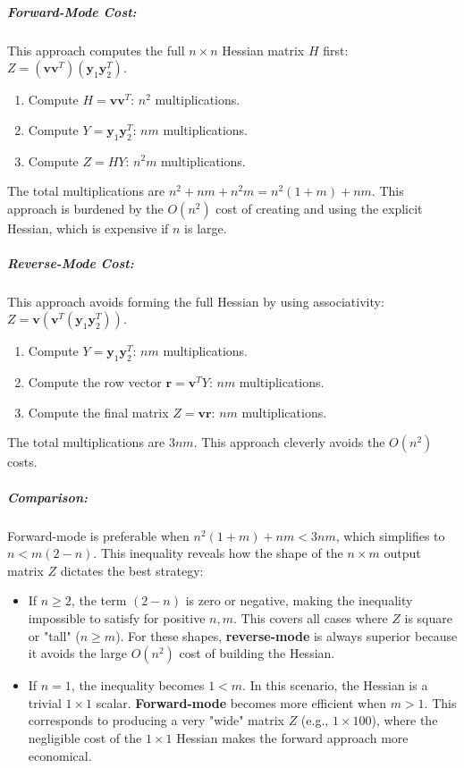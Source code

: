 \documentclass{article}
\begin{document}
\subparagraph{Forward-Mode Cost:}
This approach computes the full $n \times n$ Hessian matrix $H$ first: $Z = (\mathbf{v}\mathbf{v}^T) (\mathbf{y}_1\mathbf{y}_2^T)$.
\begin{enumerate}
    \item Compute $H = \mathbf{v}\mathbf{v}^T$: $n^2$ multiplications.
    \item Compute $Y = \mathbf{y}_1\mathbf{y}_2^T$: $nm$ multiplications.
    \item Compute $Z = HY$: $n^2m$ multiplications.
\end{enumerate}
The total multiplications are $n^2 + nm + n^2m = n^2(1+m) + nm$. This approach is burdened by the $O(n^2)$ cost of creating and using the explicit Hessian, which is expensive if $n$ is large.

\subparagraph{Reverse-Mode Cost:}
This approach avoids forming the full Hessian by using associativity: $Z = \mathbf{v}(\mathbf{v}^T(\mathbf{y}_1\mathbf{y}_2^T))$.
\begin{enumerate}
    \item Compute $Y = \mathbf{y}_1\mathbf{y}_2^T$: $nm$ multiplications.
    \item Compute the row vector $\mathbf{r} = \mathbf{v}^T Y$: $nm$ multiplications.
    \item Compute the final matrix $Z = \mathbf{v}\mathbf{r}$: $nm$ multiplications.
\end{enumerate}
The total multiplications are $3nm$. This approach cleverly avoids the $O(n^2)$ costs.

\subparagraph{Comparison:}
Forward-mode is preferable when $n^2(1+m) + nm < 3nm$, which simplifies to $n < m(2-n)$. This inequality reveals how the shape of the $n \times m$ output matrix $Z$ dictates the best strategy:
\begin{itemize}
    \item If $n \ge 2$, the term $(2-n)$ is zero or negative, making the inequality impossible to satisfy for positive $n, m$. This covers all cases where $Z$ is square or "tall" ($n \ge m$). For these shapes, \textbf{reverse-mode} is always superior because it avoids the large $O(n^2)$ cost of building the Hessian.
    \item If $n=1$, the inequality becomes $1 < m$. In this scenario, the Hessian is a trivial $1 \times 1$ scalar. \textbf{Forward-mode} becomes more efficient when $m>1$. This corresponds to producing a very "wide" matrix $Z$ (e.g., $1 \times 100$), where the negligible cost of the $1 \times 1$ Hessian makes the forward approach more economical.
\end{itemize}
\end{document}
